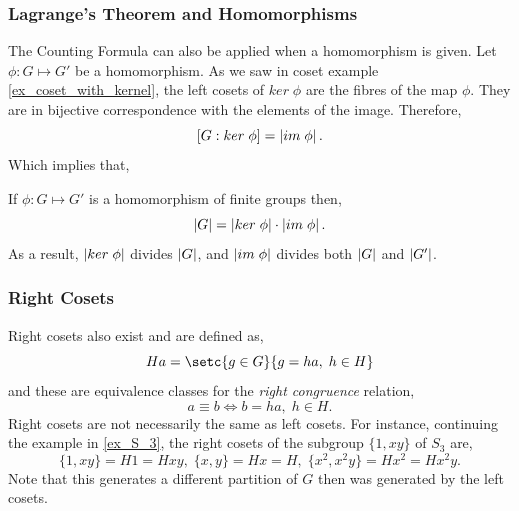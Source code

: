\documentclass[MathsNotesBase.tex]{subfiles}
\begin{document}
{		\subsubsection{Lagrange's Theorem and Homomorphisms}
		The Counting Formula can also be applied when a homomorphism is given. Let $\phi : G \longmapsto G'$ be a homomorphism. As we saw in coset example \ref{ex_coset_with_kernel}, the left cosets of $ker \; \phi$ are the fibres of the map $\phi$. They are in bijective correspondence with the elements of the image. Therefore,
		\[ [G : ker \; \phi] = \left\lvert im \; \phi\right\rvert. \]
		Which implies that,
		\begin{corollary}
			If $\phi : G \longmapsto G'$ is a homomorphism of finite groups then,
			\[ \left\lvert G\right\rvert = \left\lvert ker \; \phi\right\rvert \cdot \left\lvert im \; \phi\right\rvert. \]
			As a result, $\left\lvert ker \; \phi\right\rvert$ divides $\left\lvert G\right\rvert$, and $\left\lvert im \; \phi\right\rvert$ divides both $\left\lvert G\right\rvert$ and $\left\lvert G'\right\rvert$.
		\end{corollary}
	
		\subsubsection{Right Cosets}
		Right cosets also exist and are defined as,
		 \[ Ha = \setc{g \in G}{g = ha, \; h \in H} \]
		and these are equivalence classes for the \textit{right congruence} relation,
		\[ a \equiv b \iff b = ha, \; h \in H. \]
		Right cosets are not necessarily the same as left cosets. For instance, continuing the example in \ref{ex_S_3}, the right cosets of the subgroup $\{1, xy\}$ of $S_3$ are,
		\[ \{1, xy\} = H1 = Hxy, \; \{x, y\} = Hx = H, \; \{x^2, x^2y\} = Hx^2 = Hx^2y. \]
		Note that this generates a different partition of $G$ then was generated by the left cosets.
		
}
\end{document}
